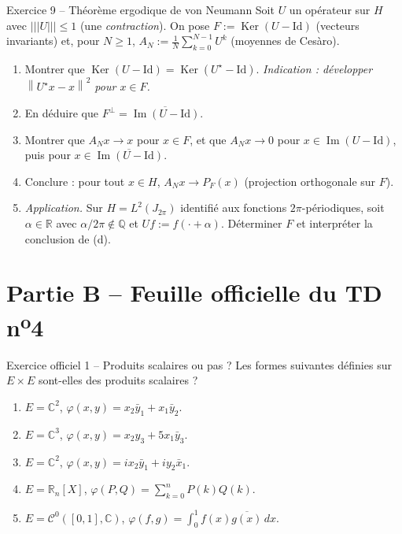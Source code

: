 \documentclass[11pt,a4paper]{article}
\newcommand{\R}{\mathbb{R}}
\newcommand{\Q}{\mathbb{Q}}
\newcommand{\C}{\mathbb{C}}
\newcommand{\adh}[1]{\overline{#1}}
\newcommand{\norm}[1]{\left\|#1\right\|}
\newcommand{\opnorm}[1]{|\!|\!|#1|\!|\!|}
\newcommand{\Cz}{\mathcal{C}^0}
\DeclareMathOperator{\Ker}{Ker}
\DeclareMathOperator{\Ima}{Im}
\theoremstyle{definition}
\begin{document}
\begin{exo}{Exercice 9 -- Théorème ergodique de von Neumann}
Soit $U$ un opérateur sur $H$ avec $\opnorm U\le1$ (une \emph{contraction}). On pose $F:=\Ker(U-\mathrm{Id})$ (vecteurs invariants) et, pour $N\ge1$, $A_N:=\frac1N\sum_{k=0}^{N-1}U^k$ (moyennes de Cesàro).
\begin{enumerate}[label=(\alph*)]
  \item Montrer que $\Ker(U-\mathrm{Id})=\Ker(U^\star-\mathrm{Id})$. \emph{Indication : développer $\norm{U^\star x-x}^2$ pour $x\in F$.}
  \item En déduire que $F^\perp=\adh{\Ima(U-\mathrm{Id})}$.
  \item Montrer que $A_Nx\to x$ pour $x\in F$, et que $A_Nx\to0$ pour $x\in\Ima(U-\mathrm{Id})$, puis pour $x\in\adh{\Ima(U-\mathrm{Id})}$.
  \item Conclure : pour tout $x\in H$, $A_Nx\to P_F(x)$ (projection orthogonale sur $F$).
  \item \emph{Application.} Sur $H=L^2(J_{2\pi})$ identifié aux fonctions $2\pi$-périodiques, soit $\alpha\in\R$ avec $\alpha/2\pi\notin\Q$ et $Uf:=f(\cdot+\alpha)$. Déterminer $F$ et interpréter la conclusion de (d).
\end{enumerate}
\end{exo}

\section*{Partie B -- Feuille officielle du TD n\textsuperscript{o}4}

\begin{exo}{Exercice officiel 1 -- Produits scalaires ou pas ?}
Les formes suivantes définies sur $E\times E$ sont-elles des produits scalaires ?
\begin{enumerate}[label=(\alph*)]
  \item $E=\C^2$, $\varphi(x,y)=x_2\bar y_1+x_1\bar y_2$.
  \item $E=\C^3$, $\varphi(x,y)=x_2y_3+5x_1\bar y_3$.
  \item $E=\C^2$, $\varphi(x,y)=ix_2\bar y_1+iy_2\bar x_1$.
  \item $E=\R_n[X]$, $\varphi(P,Q)=\sum_{k=0}^nP(k)Q(k)$.
  \item $E=\Cz([0,1],\C)$, $\varphi(f,g)=\int_0^1f(x)\overline{g(x)}\,dx$.
\end{enumerate}
\end{exo}
\end{document}
